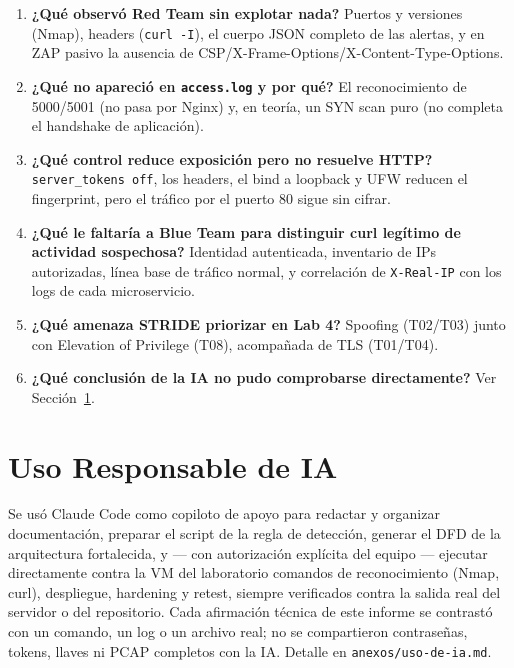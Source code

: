 \documentclass[journal]{IEEEtran}
\begin{document}
\begin{enumerate}
    \item \textbf{¿Qué observó Red Team sin explotar nada?} Puertos y
    versiones (Nmap), headers (\texttt{curl -I}), el cuerpo JSON completo de
    las alertas, y en ZAP pasivo la ausencia de CSP/X-Frame-Options/X-Content-Type-Options.
    \item \textbf{¿Qué no apareció en \texttt{access.log} y por qué?} El
    reconocimiento de 5000/5001 (no pasa por Nginx) y, en teoría, un SYN scan
    puro (no completa el handshake de aplicación).
    \item \textbf{¿Qué control reduce exposición pero no resuelve HTTP?}
    \texttt{server\_tokens off}, los headers, el bind a loopback y UFW
    reducen el fingerprint, pero el tráfico por el puerto 80 sigue sin
    cifrar.
    \item \textbf{¿Qué le faltaría a Blue Team para distinguir curl legítimo
    de actividad sospechosa?} Identidad autenticada, inventario de IPs
    autorizadas, línea base de tráfico normal, y correlación de
    \texttt{X-Real-IP} con los logs de cada microservicio.
    \item \textbf{¿Qué amenaza STRIDE priorizar en Lab 4?} Spoofing
    (T02/T03) junto con Elevation of Privilege (T08), acompañada de TLS
    (T01/T04).
    \item \textbf{¿Qué conclusión de la IA no pudo comprobarse
    directamente?} Ver Sección~\ref{sec:ia}.
\end{enumerate}

\section{Uso Responsable de IA}
\label{sec:ia}

Se usó Claude Code como copiloto de apoyo para redactar y organizar
documentación, preparar el script de la regla de detección, generar el DFD
de la arquitectura fortalecida, y --- con autorización explícita del equipo
--- ejecutar directamente contra la VM del laboratorio comandos de
reconocimiento (Nmap, curl), despliegue, hardening y retest, siempre
verificados contra la salida real del servidor o del repositorio. Cada
afirmación técnica de este informe se contrastó con un comando, un log o un
archivo real; no se compartieron contraseñas, tokens, llaves ni PCAP
completos con la IA. Detalle en \texttt{anexos/uso-de-ia.md}.
\end{document}

